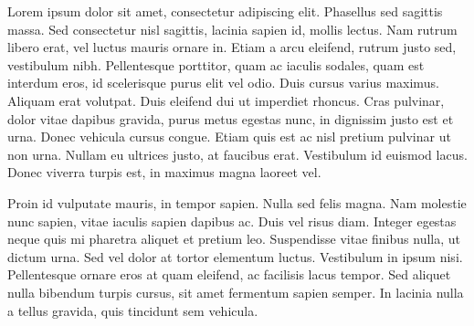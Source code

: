 
\begin{enAbstract}

    Lorem ipsum dolor sit amet, consectetur adipiscing elit. Phasellus sed sagittis massa. Sed consectetur nisl sagittis, lacinia sapien id, mollis lectus. Nam rutrum libero erat, vel luctus mauris ornare in. Etiam a arcu eleifend, rutrum justo sed, vestibulum nibh. Pellentesque porttitor, quam ac iaculis sodales, quam est interdum eros, id scelerisque purus elit vel odio. Duis cursus varius maximus. Aliquam erat volutpat. Duis eleifend dui ut imperdiet rhoncus. Cras pulvinar, dolor vitae dapibus gravida, purus metus egestas nunc, in dignissim justo est et urna. Donec vehicula cursus congue. Etiam quis est ac nisl pretium pulvinar ut non urna. Nullam eu ultrices justo, at faucibus erat. Vestibulum id euismod lacus. Donec viverra turpis est, in maximus magna laoreet vel.

    Proin id vulputate mauris, in tempor sapien. Nulla sed felis magna. Nam molestie nunc sapien, vitae iaculis sapien dapibus ac. Duis vel risus diam. Integer egestas neque quis mi pharetra aliquet et pretium leo. Suspendisse vitae finibus nulla, ut dictum urna. Sed vel dolor at tortor elementum luctus. Vestibulum in ipsum nisi. Pellentesque ornare eros at quam eleifend, ac facilisis lacus tempor. Sed aliquet nulla bibendum turpis cursus, sit amet fermentum sapien semper. In lacinia nulla a tellus gravida, quis tincidunt sem vehicula.
    \enAbsKeywords
\end{enAbstract}
